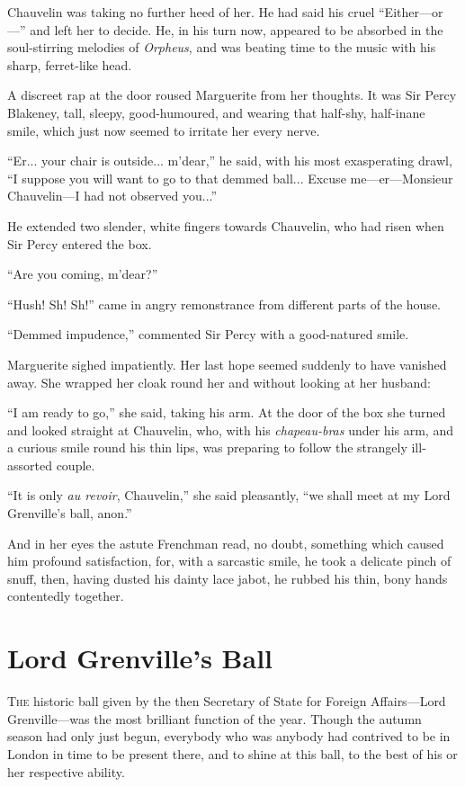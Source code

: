 \documentclass[paper=5.5in:8.5in,BCOR=7mm,twoside,DIV=calc,12pt,usegeometry,chapterprefix,endperiod,headings=big]{scrbook}
\begin{document}
Chauvelin was taking no further heed of her. He had said his cruel \enquote{Either---or---} and left her to decide. He, in his turn now, appeared to be absorbed in the soul-stirring melodies of \textit{Orpheus}, and was beating time to the music with his sharp, ferret-like head.

A discreet rap at the door roused Marguerite from her thoughts. It was Sir Percy Blakeney, tall, sleepy, good-humoured, and wearing that half-shy, half-inane smile, which just now seemed to irritate her every nerve.

\enquote{Er... your chair is outside... m'dear,} he said, with his most exasperating drawl, \enquote{I suppose you will want to go to that demmed ball... Excuse me---er---Monsieur Chauvelin---I had not observed you...}

He extended two slender, white fingers towards Chauvelin, who had risen when Sir Percy entered the box.

\enquote{Are you coming, m'dear?}

\enquote{Hush! Sh! Sh!} came in angry remonstrance from different parts of the house.

\enquote{Demmed impudence,} commented Sir Percy with a good-natured smile.

Marguerite sighed impatiently. Her last hope seemed suddenly to have vanished away. She wrapped her cloak round her and without looking at her husband:

\enquote{I am ready to go,} she said, taking his arm. At the door of the box she turned and looked straight at Chauvelin, who, with his \textit{chapeau-bras} under his arm, and a curious smile round his thin lips, was preparing to follow the strangely ill-assorted couple.

\enquote{It is only \textit{au revoir}, Chauvelin,} she said pleasantly, \enquote{we shall meet at my Lord Grenville's ball, anon.}

And in her eyes the astute Frenchman read, no doubt, something which caused him profound satisfaction, for, with a sarcastic smile, he took a delicate pinch of snuff, then, having dusted his dainty lace jabot, he rubbed his thin, bony hands contentedly together.

\chapter{Lord Grenville's Ball}
\lettrine[lines=4]{T}{he} historic ball given by the then Secretary of State for Foreign Affairs---Lord Grenville---was the most brilliant function of the year. Though the autumn season had only just begun, everybody who was anybody had contrived to be in London in time to be present there, and to shine at this ball, to the best of his or her respective ability.
\end{document}
